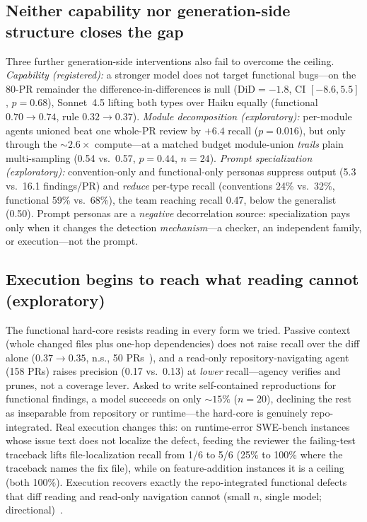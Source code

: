 \documentclass[conference]{IEEEtran}
\begin{document}
\subsection{Neither capability nor generation-side structure closes the gap}
\label{sec:nulls}
Three further generation-side interventions also fail to overcome the ceiling.
\emph{Capability (registered):} a stronger model does not target functional
bugs---on the 80-PR remainder the difference-in-differences is null
($\mathrm{DiD}{=}{-}1.8$, CI $[-8.6,5.5]$, $p{=}0.68$), Sonnet~4.5 lifting both
types over Haiku equally (functional $0.70{\to}0.74$, rule $0.32{\to}0.37$).
\emph{Module decomposition (exploratory):} per-module agents unioned beat one
whole-PR review by ${+}6.4$ recall ($p{=}0.016$), but only through the
${\sim}2.6\times$ compute---at a matched budget module-union \emph{trails} plain
multi-sampling (0.54 vs.\ 0.57, $p{=}0.44$, $n{=}24$). \emph{Prompt specialization
(exploratory):} convention-only and functional-only personas suppress output
(5.3 vs.\ 16.1 findings/PR) and \emph{reduce} per-type recall (conventions 24\%
vs.\ 32\%, functional 59\% vs.\ 68\%), the team reaching recall 0.47, below the
generalist (0.50). Prompt personas are a \emph{negative} decorrelation source:
specialization pays only when it changes the detection \emph{mechanism}---a
checker, an independent family, or execution---not the prompt.

\subsection{Execution begins to reach what reading cannot (exploratory)}
\label{sec:execution}
The functional hard-core resists reading in every form we tried. Passive context
(whole changed files plus one-hop dependencies) does not raise recall over the
diff alone ($0.37{\to}0.35$, n.s., 50 PRs~\cite{crab}), and a read-only
repository-navigating agent (158 PRs) raises precision (0.17 vs.\ 0.13) at
\emph{lower} recall---agency verifies and prunes, not a coverage lever. Asked to
write self-contained reproductions for functional findings, a model succeeds on
only ${\sim}15\%$ ($n{=}20$), declining the rest as inseparable from repository
or runtime---the hard-core is genuinely repo-integrated. Real execution changes
this: on runtime-error SWE-bench instances whose issue text does not localize the
defect, feeding the reviewer the failing-test traceback lifts file-localization
recall from 1/6 to 5/6 (25\% to 100\% where the traceback names the fix file),
while on feature-addition instances it is a ceiling (both 100\%). Execution
recovers exactly the repo-integrated functional defects that diff reading and
read-only navigation cannot (small $n$, single model;
directional)~\cite{swereview}.
\end{document}
